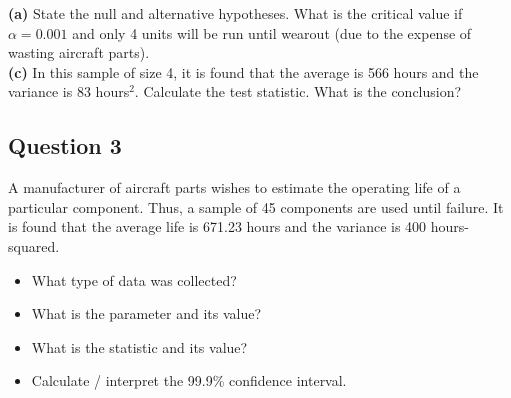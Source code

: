 \documentclass[12pt]{article}
\begin{document}
{\bf(a)} State the null and alternative hypotheses.  What is the critical value if $\alpha=0.001$ and only 4 units will be run until wearout (due to the expense of wasting aircraft parts). \quad \\ {\bf(c)} In this sample of size 4, it is found that the average is 566 hours and the variance is 83 hours$^2$. Calculate the test statistic.  What is the conclusion?



	\subsection*{Question 3}
	A manufacturer of aircraft parts wishes to estimate the operating life of a particular component. Thus, a sample of 45 components are used until failure. It is found that the average life is 671.23 hours and the variance is 400 hours-squared.
	\begin{itemize}
		\item[{\bf(a)}] What type of data was collected? \quad \item[{\bf(b)}] What is the parameter and its value? \quad \item[{\bf(c)}] What is the statistic and its value? \quad \item[{\bf(d)}] Calculate / interpret the 99.9\% confidence interval.
	\end{itemize}
	
\end{document}
